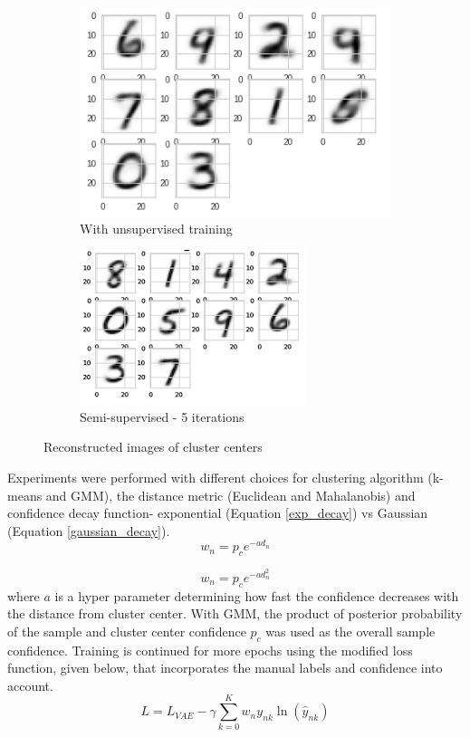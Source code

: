 \documentclass[runningheads]{llncs}
\begin{document}
\begin{figure}
\centering
\begin{subfigure}[t]{.45\textwidth}
  \centering
  \includegraphics[width=.5\linewidth]{cluster_centers_epoch_1_0_gmm.png}
  \caption{With unsupervised training}
  \label{cluster_center_1}
\end{subfigure}\hfill
\begin{subfigure}[t]{.45\textwidth}
  \centering
  \includegraphics[width=.5\linewidth]{cluster_centers_epoch_5_0_gmm.png}
  \caption{Semi-supervised - 5 iterations}
  \label{cluster_center_5}
\end{subfigure}
\caption{Reconstructed images of cluster centers}
\label{cluster_center}
\end{figure}

Experiments were performed with different choices for  clustering algorithm (k-means and GMM), the distance metric (Euclidean and Mahalanobis) and confidence decay function- exponential (Equation \ref{exp_decay}) vs Gaussian (Equation \ref{gaussian_decay}).
\begin{equation}
    w_n = p_ce^{-a d_n}
    \label{exp_decay}
\end{equation}

\vspace{-0.2in}
\begin{equation}
    w_n = p_ce^{-a d_n^2}
    \label{gaussian_decay}
\end{equation}
where $a$ is a hyper parameter determining how fast the confidence decreases with the distance from cluster center.
With GMM, the product of posterior probability of the sample and cluster center confidence $p_c$ was used as the overall sample confidence.
Training is continued for more epochs using the modified loss function, given below, that incorporates the manual labels and confidence into account.
\begin{equation} \label{semi_supervised_loss}
L = L_{VAE}  - \gamma \sum_{k=0}^{K}w_{n}y_{nk}\ln(\hat{y}_{nk})
\end{equation}
\end{document}
